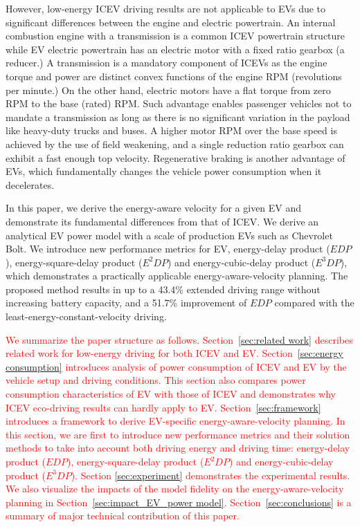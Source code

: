\documentclass{IEEEtran}
\begin{document}
However, low-energy ICEV driving results are not applicable to EVs due to significant differences 
between the engine and electric powertrain. An internal combustion engine with a transmission is a common ICEV powertrain structure while EV electric powertrain has an electric motor with a fixed ratio gearbox (a reducer.) A transmission is a mandatory component of ICEVs as the engine torque and power are distinct convex functions of the engine RPM (revolutions per minute.) On the other hand, electric motors have a flat torque from zero RPM to the base (rated) RPM. Such advantage enables passenger vehicles not to mandate a transmission as long as there is no significant variation in the payload like heavy-duty trucks and buses. A higher motor RPM over the base speed is achieved by the use of field weakening, and a single reduction ratio gearbox can exhibit a fast enough top velocity. Regenerative braking is another advantage of EVs, which fundamentally changes the vehicle power consumption when it decelerates.

In this paper, we derive the energy-aware velocity for a given EV and demonstrate its fundamental differences from that of ICEV.
We derive an analytical EV power model with a scale of production EVs such as Chevrolet  Bolt. We introduce new performance metrics for EV, energy-delay product ($EDP$), energy-square-delay product ($E^2DP$) and energy-cubic-delay product ($E^3DP$), which demonstrates a practically applicable energy-aware-velocity planning. The proposed method results in up to a 43.4\% extended driving range without increasing battery capacity, and a 51.7\% improvement of $EDP$ compared with the least-energy-constant-velocity driving. 


\textcolor{red}{We summarize the paper structure as follows. Section~\ref{sec:related work} describes related work for low-energy driving for both ICEV and EV. Section~\ref{sec:energy consumption} introduces analysis of power consumption of ICEV and EV  by the vehicle setup and driving conditions. This section also compares power consumption characteristics of EV with those of ICEV and demonstrates why  ICEV eco-driving results can hardly apply to EV. Section~\ref{sec:framework} introduces a framework to derive EV-specific energy-aware-velocity planning. In this section, we are first to introduce new performance metrics and their solution methods to take into account both driving energy and driving time: energy-delay product ($EDP$), energy-square-delay product ($E^2DP$) and energy-cubic-delay product ($E^3DP$). Section \ref{sec:experiment} demonstrates the experimental results. 
We also visualize the impacts of the model fidelity on the energy-aware-velocity planning in Section~\ref{sec:impact_EV_power model}. Section~\ref{sec:conclusions} is a summary of major technical contribution of this paper.}
\end{document}
